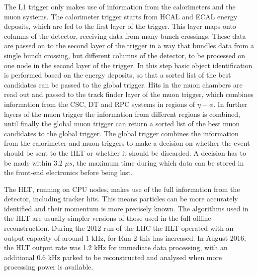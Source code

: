The \ac{L1} trigger only makes use of information from the calorimeters and the muon systems.
The calorimeter trigger starts from \ac{HCAL} and \ac{ECAL} energy deposits, 
which are fed to the first layer of the trigger. This layer maps onto
columns of the detector, receiving data from many bunch crossings. These data are passed
on to the second layer of the trigger in a way that bundles data from a single bunch crossing, but
different columns of the detector, to be processed on one node in the second layer of the
trigger. In this step basic object identification is performed based on the energy
deposits, so that a sorted list of the best candidates can be passed to the global trigger.
Hits in the muon chambers are read out and passed to the track finder layer 
of the muon trigger, which combines information from the \ac{CSC}, \ac{DT}
and \ac{RPC} systems in regions of $\eta-\phi$.
In further layers of the muon trigger the information from different
regions is combined, until finally the global muon trigger
can return a sorted list of the best muon candidates to the global trigger.
The global trigger combines the information from the calorimeter and muon triggers
to make a decision on whether the event should be sent to the \ac{HLT} or whether
it should be discarded. A decision has to be made within 3.2 $\mu s$, the maximum time during
which data can be stored in the front-end electronics before being lost.


The \ac{HLT}, running on CPU nodes, makes use of the full information
from the detector, including tracker hits. This means particles
can be more accurately identified and their momentum is more
precisely known. The algorithms used in the \ac{HLT} are usually simpler
versions of those used in the full offline reconstruction. %
During the 2012 run of the \ac{LHC} the \ac{HLT} operated with an output
capacity of around 1 kHz, for Run 2 this has increased. In August 2016, 
the \ac{HLT} output rate was 1.2 kHz for immediate data processing, with
an additional 0.6 kHz parked to be reconstructed and analysed when 
more processing power is available\cite{CMS-PAS-HIG-16-037}. %

